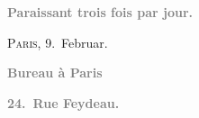 \pstart
           \begin{otherlanguage}{french}\textcolor{gray}{\textbf{\textbf{Paraissant trois fois par jour.}}}\end{otherlanguage}\hfill \textsc{Paris}, 9. Februar.\pend
           
\pstart
           \begin{otherlanguage}{french}\textcolor{gray}{\textbf{\textbf{Bureau à Paris}}}\end{otherlanguage}\pend
           
\pstart
           \begin{otherlanguage}{french}\textcolor{gray}{\textbf{\textbf{24. Rue Feydeau.}}}\end{otherlanguage}\pend
           
